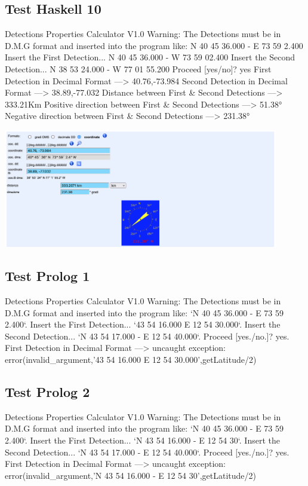 \documentclass{article}
\begin{document}
\subsection*{Test Haskell 10}
	\begin{spverbatim}
		Detections Properties Calculator V1.0 
		Warning: The Detections must be in D.M.G format and inserted into the program like: N 40 45 36.000 - E 73 59 2.400
		Insert the First Detection...
		N 40 45 36.000 - W 73 59 02.400
		Insert the Second Detection...
		N 38 53 24.000 - W 77 01 55.200
		Proceed [yes/no]?
		yes
		First Detection in Decimal Format ---> 40.76,-73.984
		Second Detection in Decimal Format ---> 38.89,-77.032
		Distance between First & Second Detections ---> 333.21Km
		Positive direction between First & Second Detections ---> 51.38°
		Negative direction between First & Second Detections ---> 231.38°
	\end{spverbatim}
	\bigskip
	\includegraphics[width=0.9\textwidth]{Haskell_Tests/10-Calculation_of_Distant_Coordinates_Check}
	
\newpage
\subsection*{Test Prolog 1}
	\begin{spverbatim}
		Detections Properties Calculator V1.0
		Warning: The Detections must be in D.M.G format and inserted into the program like: `N 40 45 36.000 - E 73 59 2.400`.
		Insert the First Detection...
		`43 54 16.000  E 12 54 30.000`.
		Insert the Second Detection...
		`N 43 54 17.000 - E 12 54 40.000`.
		Proceed [yes./no.]?
		yes.
		First Detection in Decimal Format ---> 
		uncaught exception: error(invalid_argument,'43 54 16.000  E 12 54 30.000',getLatitude/2)
	\end{spverbatim}

\subsection*{Test Prolog 2}
	\begin{spverbatim}
		Detections Properties Calculator V1.0
		Warning: The Detections must be in D.M.G format and inserted into the program like: `N 40 45 36.000 - E 73 59 2.400`.
		Insert the First Detection...
		`N 43 54 16.000 - E 12 54 30`.
		Insert the Second Detection...
		`N 43 54 17.000 - E 12 54 40.000`.
		Proceed [yes./no.]?
		yes.
		First Detection in Decimal Format ---> 
		uncaught exception: error(invalid_argument,'N 43 54 16.000 - E 12 54 30',getLatitude/2)
	\end{spverbatim}
\end{document}
